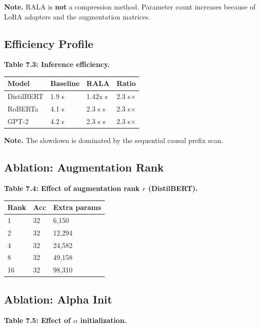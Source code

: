 \textbf{Note.} RALA is \textbf{not} a compression method. Parameter count increases 
because of LoRA adapters and the augmentation matrices.

\subsection{Efficiency Profile}

\textbf{Table 7.3: Inference efficiency.}

\begin{table}[H]
\centering
\small
\begin{tabular}{llll}
\toprule
\textbf{Model} & \textbf{Baseline} & \textbf{RALA} & \textbf{Ratio} \\
\midrule
DistilBERT & 1.9 s & 1.42x s & 2.3 s$\times$ \\
RoBERTa & 4.1 s & 2.3 s s & 2.3 s$\times$ \\
GPT-2 & 4.2 s & 2.3 s s & 2.3 s$\times$ \\
\bottomrule
\end{tabular}
\end{table}

\textbf{Note.} The slowdown is dominated by the sequential causal prefix scan.

\subsection{Ablation: Augmentation Rank}

\textbf{Table 7.4: Effect of augmentation rank $r$ (DistilBERT).}

\begin{table}[H]
\centering
\small
\begin{tabular}{lll}
\toprule
\textbf{Rank} & \textbf{Acc} & \textbf{Extra params} \\
\midrule
1 & 32 & 6,150 \\
2 & 32 & 12,294 \\
4 & 32 & 24,582 \\
8 & 32 & 49,158 \\
16 & 32 & 98,310 \\
\bottomrule
\end{tabular}
\end{table}

\subsection{Ablation: Alpha Init}

\textbf{Table 7.5: Effect of $\alpha$ initialization.}

